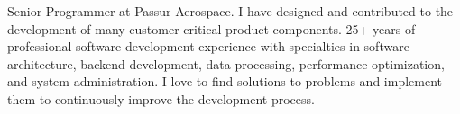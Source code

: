 
\begin{cvparagraph}
Senior Programmer at Passur Aerospace. I have designed and contributed to the development of many customer critical product components. 25+ years of professional software development experience with specialties in software architecture, backend development, data processing, performance optimization, and system administration. I love to find solutions to problems and implement them to continuously improve the development process.
\end{cvparagraph}
